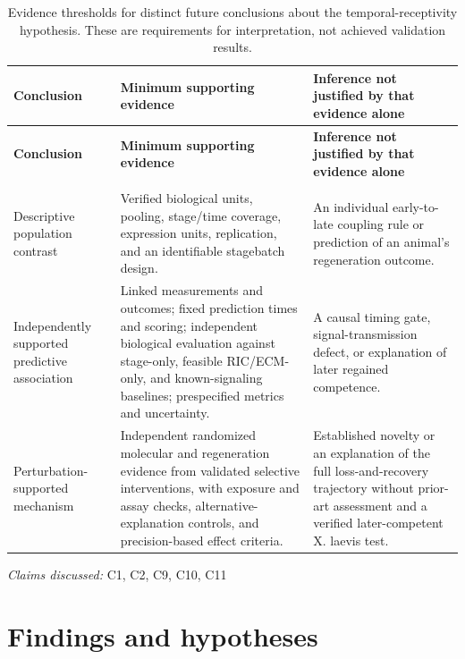 \documentclass[11pt]{article}
\begin{document}
\begin{longtable}{@{}>{\raggedright\arraybackslash}p{}>{\raggedright\arraybackslash}p{}>{\raggedright\arraybackslash}p{}@{}}
\caption{Evidence thresholds for distinct future conclusions about the temporal-receptivity hypothesis. These are requirements for interpretation, not achieved validation results.}\\
\toprule
\textbf{Conclusion} & \textbf{Minimum supporting evidence} & \textbf{Inference not justified by that evidence alone}\\
\midrule
\endfirsthead
\toprule
\textbf{Conclusion} & \textbf{Minimum supporting evidence} & \textbf{Inference not justified by that evidence alone}\\
\midrule
\endhead
\midrule
\multicolumn{3}{r}{\footnotesize Continued on next page}\\
\endfoot
\bottomrule
\endlastfoot
Descriptive population contrast & Verified biological units, pooling, stage/time coverage, expression units, replication, and an identifiable stage\textendash{}batch design. & An individual early-to-late coupling rule or prediction of an animal's regeneration outcome.\\
Independently supported predictive association & Linked measurements and outcomes; fixed prediction times and scoring; independent biological evaluation against stage-only, feasible RIC/ECM-only, and known-signaling baselines; prespecified metrics and uncertainty. & A causal timing gate, signal-transmission defect, or explanation of later regained competence.\\
Perturbation-supported mechanism & Independent randomized molecular and regeneration evidence from validated selective interventions, with exposure and assay checks, alternative-explanation controls, and precision-based effect criteria. & Established novelty or an explanation of the full loss-and-recovery trajectory without prior-art assessment and a verified later-competent X. laevis test.\\
\end{longtable}
\par{}
\textit{Claims discussed: }C1, C2, C9, C10, C11
\section{Findings and hypotheses}
\end{document}
